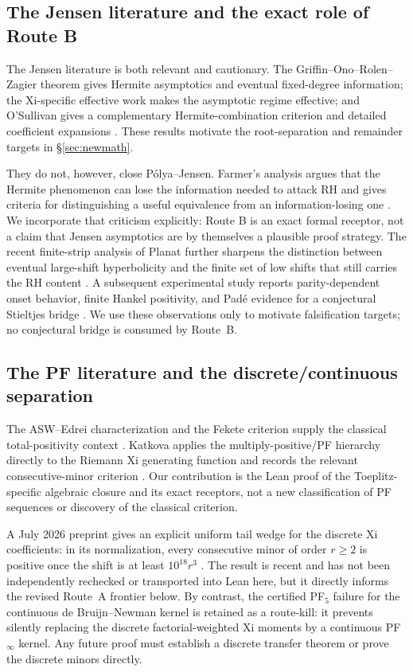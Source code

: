 \documentclass[11pt,a4paper]{article}
\theoremstyle{definition}
\begin{document}
\subsection{The Jensen literature and the exact role of Route B}

The Jensen literature is both relevant and cautionary.  The
Griffin--Ono--Rolen--Zagier theorem gives Hermite asymptotics and eventual
fixed-degree information; the Xi-specific effective work makes the asymptotic
regime effective; and O'Sullivan gives a complementary Hermite-combination
criterion and detailed coefficient expansions
\cite{GORZ2019,XiEffective,OSullivan}.  These results motivate the
root-separation and remainder targets in \S\ref{sec:newmath}.

They do not, however, close P\'olya--Jensen.  Farmer's analysis argues that
the Hermite phenomenon can lose the information needed to attack RH and gives
criteria for distinguishing a useful equivalence from an information-losing
one \cite{Farmer2022}.  We incorporate that criticism explicitly: Route B is
an exact formal receptor, not a claim that Jensen asymptotics are by
themselves a plausible proof strategy.  The recent finite-strip analysis of
Planat further sharpens the distinction between eventual large-shift
hyperbolicity and the finite set of low shifts that still carries the RH
content \cite{Planat2026}.  A subsequent experimental study reports
parity-dependent onset behavior, finite Hankel positivity, and Pad\'e evidence
for a conjectural Stieltjes bridge \cite{PlanatStieltjes2026}.  We use these
observations only to motivate falsification targets; no conjectural bridge is
consumed by Route~B.

\subsection{The PF literature and the discrete/continuous separation}

The ASW--Edrei characterization and the Fekete criterion supply the classical
total-positivity context \cite{ASW1952,Edrei1953,GK,Pinkus}.  Katkova applies
the multiply-positive/PF hierarchy directly to the Riemann Xi generating
function and records the relevant consecutive-minor criterion
\cite{Katkova2007}.  Our contribution is the Lean proof of the
Toeplitz-specific algebraic closure and its exact receptors, not a new
classification of PF sequences or discovery of the classical criterion.

A July 2026 preprint gives an explicit uniform tail wedge for the discrete Xi
coefficients: in its normalization, every consecutive minor of order $r\ge2$
is positive once the shift is at least $10^{18}r^3$
\cite{CubicWedge2026}.  The result is recent and has not been independently
rechecked or transported into Lean here, but it directly informs the revised
Route~A frontier below.  By contrast, the certified PF$_5$ failure for the
continuous de Bruijn--Newman kernel \cite{PF5counterexample} is retained as a
route-kill: it prevents silently replacing the discrete factorial-weighted Xi
moments by a continuous PF$_\infty$ kernel.  Any future proof must establish a
discrete transfer theorem or prove the discrete minors directly.
\end{document}
